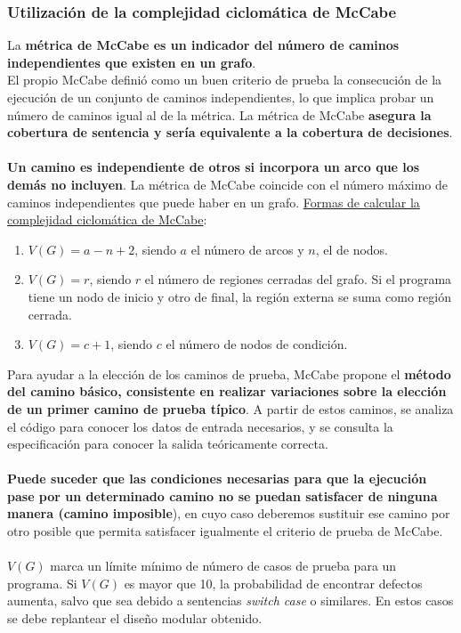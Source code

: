 \subsubsection{Utilización de la complejidad ciclomática de McCabe}
La \textbf{métrica de McCabe es un indicador del número de caminos independientes que existen en un grafo}.\\
El propio McCabe definió como un buen criterio de prueba la consecución de la ejecución de un conjunto de caminos independientes, lo que implica probar un número de caminos igual al de la métrica. La métrica de McCabe \textbf{asegura la cobertura de sentencia y sería equivalente a la cobertura de decisiones}.
\\\\
\textbf{Un camino es independiente de otros si incorpora un arco que los demás no incluyen}. La métrica de McCabe coincide con el número máximo de caminos independientes que puede haber en un grafo. \uline{Formas de calcular la complejidad ciclomática de McCabe}:
\begin{enumerate}
    \item $V (G) = a-n+2$, siendo $a$ el número de arcos y $n$, el de nodos.
    \item $V (G) = r$, siendo $r$ el número de regiones cerradas del grafo. Si el programa tiene un nodo de inicio y otro de final, la región externa se suma como región cerrada.
    \item $V (G) = c+1$, siendo $c$ el número de nodos de condición.
\end{enumerate}

Para ayudar a la elección de los caminos de prueba, McCabe propone el \textbf{método del camino básico, consistente en realizar variaciones sobre la elección de un primer camino de prueba típico}. A partir de estos caminos, se analiza el código para conocer los datos de entrada necesarios, y se consulta la especificación para conocer la salida teóricamente correcta.\\\\
\textbf{Puede suceder que las condiciones necesarias para que la ejecución pase por un determinado camino no se puedan satisfacer de ninguna manera (camino imposible}), en cuyo caso deberemos sustituir ese camino por otro posible que permita satisfacer igualmente el criterio de prueba de McCabe.
\\\\
$V (G)$ marca un límite mínimo de número de casos de prueba para un programa. Si $V (G)$ es mayor que 10, la probabilidad de encontrar defectos aumenta, salvo que sea debido a sentencias \textit{switch case} o similares. En estos casos se debe replantear el diseño modular obtenido.



